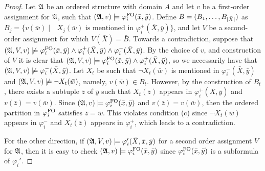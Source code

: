 \begin{proof}
Let $\mathfrak{A}$ be an ordered structure with domain $A$ and let $v$ be a first-order assignment for $\mathfrak{A}$, such that $(\mathfrak{A},v)\models\varphi^{{\rm FO}}_i(\bar{x},\bar{y})$.
Define $\bar{B} = (B_1,\ldots,B_{\vert \bar{X} \vert})$ as $B_j = \{v(\bar{w})\mid \text{ $X_j(\bar{w})$ is mentioned in $\varphi^{+}_i(\bar{X},\bar{y})$}\}$, and let $V$ be a second-order assignment for which $V(\bar{X}) = \bar{B}$.
Towards a contradiction, suppose that $(\mathfrak{A},V,v)\not\models \varphi^{{\rm FO}}_i(\bar{x},\bar{y}) \wedge \varphi^{+}_i(\bar{X}, \bar{y}) \wedge \varphi^{-}_i(\bar{X},\bar{y})$.
By the choice of $v$, and construction of $V$ it is clear that $(\mathfrak{A},V,v)\models\varphi^{{\rm FO}}_i(\bar{x},\bar{y})\wedge\varphi^{+}_i(\bar{X},\bar{y})$, so we necessarily have that $(\mathfrak{A},V,v)\not\models\varphi^{-}_i(\bar{X},\bar{y})$.
Let $X_t$ be such that $\neg X_t(\bar{w})$ is mentioned in $\varphi^{-}_i(\bar{X},\bar{y})$ and $(\mathfrak{A},V, v)\not\models\neg X_t(\bar{w})$, namely, $v(\bar{w})\in B_t$. 
However, by the construction of $B_t$, there exists a subtuple $\bar{z}$ of $\bar{y}$ such that $X_t(\bar{z})$ appears in $\varphi^{+}_i(\bar{X},\bar{y})$ and $v(\bar{z}) = v(\bar{w})$. Since $(\mathfrak{A},v)\models\varphi^{{\rm FO}}_i(\bar{x},\bar{y})$ and $v(\bar{z}) = v(\bar{w})$, then the ordered partition in $\varphi^{{\rm FO}}_i$ satisfies $\bar{z} = \bar{w}$. This violates condition (c) since $\neg X_t(\bar{w})$ appears in $\varphi^{-}_i$ and $X_t(\bar{z})$ appears in $\varphi^{+}_i$, which leads to a contradiction. 

For the other direction, if $(\mathfrak{A},V,v)\models \varphi_i'(\bar{X},\bar{x}, \bar{y})$ for a second order assignment $V$ for $\mathfrak{A}$, then it is easy to check $(\mathfrak{A},v)\models\varphi^{{\rm FO}}_i(\bar{x},\bar{y})$ since $\varphi^{{\rm FO}}_i(\bar{x},\bar{y})$ is a subformula of $\varphi_i'$.
\end{proof}

